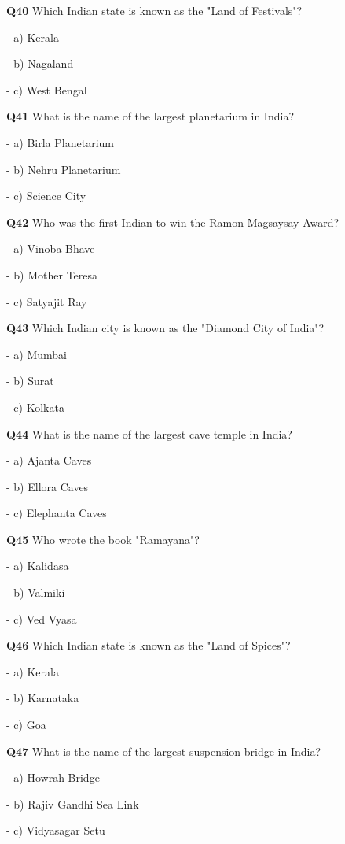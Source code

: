 \textbf{Q40} Which Indian state is known as the "Land of Festivals"?\par
\quad - a) Kerala\par
\quad - b) Nagaland\par
\quad - c) West Bengal\par

\textbf{Q41} What is the name of the largest planetarium in India?\par
\quad - a) Birla Planetarium\par
\quad - b) Nehru Planetarium\par
\quad - c) Science City\par

\textbf{Q42} Who was the first Indian to win the Ramon Magsaysay Award?\par
\quad - a) Vinoba Bhave\par
\quad - b) Mother Teresa\par
\quad - c) Satyajit Ray\par

\textbf{Q43} Which Indian city is known as the "Diamond City of India"?\par
\quad - a) Mumbai\par
\quad - b) Surat\par
\quad - c) Kolkata\par

\textbf{Q44} What is the name of the largest cave temple in India?\par
\quad - a) Ajanta Caves\par
\quad - b) Ellora Caves\par
\quad - c) Elephanta Caves\par

\textbf{Q45} Who wrote the book "Ramayana"?\par
\quad - a) Kalidasa\par
\quad - b) Valmiki\par
\quad - c) Ved Vyasa\par

\textbf{Q46} Which Indian state is known as the "Land of Spices"?\par
\quad - a) Kerala\par
\quad - b) Karnataka\par
\quad - c) Goa\par

\textbf{Q47} What is the name of the largest suspension bridge in India?\par
\quad - a) Howrah Bridge\par
\quad - b) Rajiv Gandhi Sea Link\par
\quad - c) Vidyasagar Setu\par

